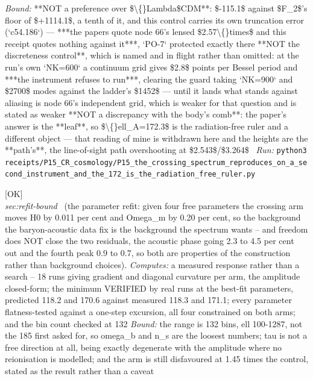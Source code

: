 \begin{description}
 \emph{Bound:}  **NOT a preference over \$\textbackslash\{\}Lambda\$CDM**: \$-115.1\$ against \$F\_2\$'s floor of \$+1114.1\$, a tenth of it, and this control carries its own truncation error (`c54.186`) --- ***the papers quote node 66's lensed \$2.57\textbackslash\{\}times\$ and this receipt quotes nothing against it***, `PO-7` protected exactly there  **NOT the discreteness control**, which is named and in flight rather than omitted: at the run's own `NK=600` a continuum grid gives \$2.8\$ points per Bessel period and ***the instrument refuses to run***, clearing the guard taking `NK=900` and \$2700\$ modes against the ladder's \$1452\$ --- until it lands what stands against aliasing is node 66's independent grid, which is weaker for that question and is stated as weaker  **NOT a discrepancy with the body's comb**: the paper's answer is the **leaf**, so \$\textbackslash\{\}ell\_A=172.3\$ is the radiation-free ruler and a different object --- that reading of mine is withdrawn here  and the heights are the **path's**, the line-of-sight path overshooting at \$2.543\$/\$3.264\$
\ \emph{Run:} \texttt{python3 receipts/P15\_CR\_cosmology/P15\_the\_crossing\_spectrum\_reproduces\_on\_a\_second\_instrument\_and\_the\_172\_is\_the\_radiation\_free\_ruler.py}
\item[\rcptlabel{P15_the_refit_leaves_the_background_where_the_distances_put_it_and_does_not_close_the_phase}{P15R167}\textbf{P15R167}\quad\texttt{P15\_the\_refit\_leaves\_the\_background\_where\_the\_distances\_put\_it\_and\_does\_not\_close\_the\_phase}]\hfill\textsf{[OK]}\\
\textit{sec:refit-bound} \ (the parameter refit: given four free parameters the crossing arm moves H0 by 0.011 per cent and Omega\_m by 0.20 per cent, so the background the baryon-acoustic data fix is the background the spectrum wants -- and freedom does NOT close the two residuals, the acoustic phase going 2.3 to 4.5 per cent out and the fourth peak 0.9 to 0.7, so both are properties of the construction rather than background choices). 
\emph{Computes:} a measured response rather than a search -- 18 runs giving gradient and diagonal curvature per arm, the amplitude closed-form; the minimum VERIFIED by real runs at the best-fit parameters, predicted 118.2 and 170.6 against measured 118.3 and 171.1; every parameter flatness-tested against a one-step excursion, all four constrained on both arms; and the bin count checked at 132
 \emph{Bound:} the range is 132 bins, ell 100-1287, not the 185 first asked for, so omega\_b and n\_s are the loosest numbers; tau is not a free direction at all, being exactly degenerate with the amplitude where no reionisation is modelled; and the arm is still disfavoured at 1.45 times the control, stated as the result rather than a caveat

\end{description}
